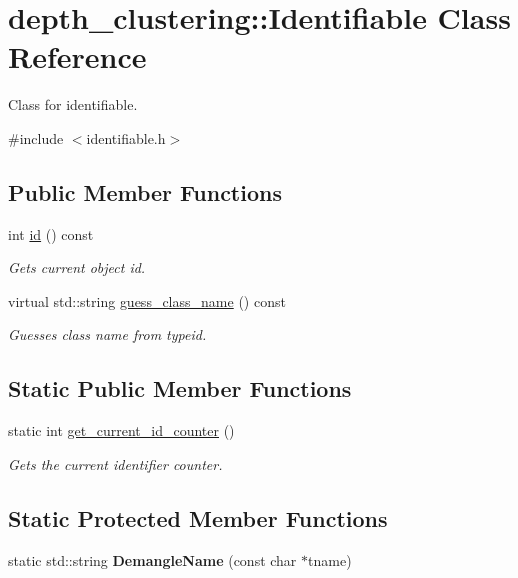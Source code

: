 \hypertarget{classdepth__clustering_1_1Identifiable}{}\section{depth\+\_\+clustering\+:\+:Identifiable Class Reference}
\label{classdepth__clustering_1_1Identifiable}


Class for identifiable.  




{\ttfamily \#include $<$identifiable.\+h$>$}

\subsection*{Public Member Functions}
\begin{DoxyCompactItemize}
\item 
int \hyperlink{classdepth__clustering_1_1Identifiable_a50f8b49ce7f7f0d9d02f31f74e0fc9e0}{id} () const
\begin{DoxyCompactList}\small\item\em Gets current object id. \end{DoxyCompactList}\item 
virtual std\+::string \hyperlink{classdepth__clustering_1_1Identifiable_a3de92b22eb8d77cf80a50998a84ecd8a}{guess\+\_\+class\+\_\+name} () const
\begin{DoxyCompactList}\small\item\em Guesses class name from typeid. \end{DoxyCompactList}\end{DoxyCompactItemize}
\subsection*{Static Public Member Functions}
\begin{DoxyCompactItemize}
\item 
static int \hyperlink{classdepth__clustering_1_1Identifiable_a7b3be5250a82404765617ba7239041f1}{get\+\_\+current\+\_\+id\+\_\+counter} ()
\begin{DoxyCompactList}\small\item\em Gets the current identifier counter. \end{DoxyCompactList}\end{DoxyCompactItemize}
\subsection*{Static Protected Member Functions}
\begin{DoxyCompactItemize}
\item 
\mbox{\label{classdepth__clustering_1_1Identifiable_a61d070e7b5adbef771d5b4df7b9e2f75}} 
static std\+::string {\bfseries Demangle\+Name} (const char $\ast$tname)
\end{DoxyCompactItemize}
